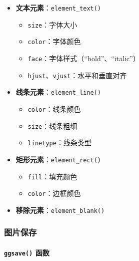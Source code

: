\documentclass[
  twoside]{book}
\providecommand{\tightlist}{%
  \setlength{\itemsep}{0pt}\setlength{\parskip}{0pt}}
\begin{document}
\begin{itemize}
\tightlist
\item
  \textbf{文本元素}：\texttt{element\_text()}

  \begin{itemize}
  \tightlist
  \item
    \texttt{size}：字体大小
  \item
    \texttt{color}：字体颜色
  \item
    \texttt{face}：字体样式（``bold''、``italic''）
  \item
    \texttt{hjust}、\texttt{vjust}：水平和垂直对齐
  \end{itemize}
\item
  \textbf{线条元素}：\texttt{element\_line()}

  \begin{itemize}
  \tightlist
  \item
    \texttt{color}：线条颜色
  \item
    \texttt{size}：线条粗细
  \item
    \texttt{linetype}：线条类型
  \end{itemize}
\item
  \textbf{矩形元素}：\texttt{element\_rect()}

  \begin{itemize}
  \tightlist
  \item
    \texttt{fill}：填充颜色
  \item
    \texttt{color}：边框颜色
  \end{itemize}
\item
  \textbf{移除元素}：\texttt{element\_blank()}
\end{itemize}

\hypertarget{ux56feux7247ux4fddux5b58}{%
\subsubsection{图片保存}\label{ux56feux7247ux4fddux5b58}}

\hypertarget{ggsave-ux51fdux6570}{%
\paragraph{\texorpdfstring{\texttt{ggsave()} 函数}{ggsave() 函数}}\label{ggsave-ux51fdux6570}}
\end{document}
